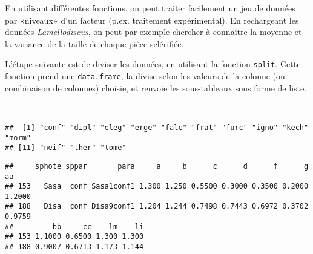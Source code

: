 En utilisant différentes fonctions, on peut traiter facilement un jeu de données par «niveaux» d'un facteur (p.ex. traitement expérimental).
En rechargeant les données \emph{Lamellodiscus}, on peut par exemple chercher à connaître la moyenne et la variance de la taille de chaque pièce sclérifiée.

\begin{knitrout}
\color{fgcolor}\begin{kframe}
\begin{flushleft}
\ttfamily\noindent
{}\hlassignement{\usebox{\hlnormalsizeboxlessthan}-}{\ }\hlkeyword{(}\hlkeyword{,}{\ }\hlargument{=}{\ }\hlkeyword{,}{\ }\hlargument{=}{\ }\hlkeyword{)}\mbox{}
\normalfont
\end{flushleft}
\end{kframe}
\end{knitrout}


\noindent L'étape suivante est de diviser les données, en utilisant la fonction \texttt{split}.
Cette fonction prend une \texttt{data.frame}, la divise selon les valeurs de la colonne (ou combinaison de colonnes) choisie, et renvoie les sous-tableaux sous forme de liste.

\begin{knitrout}
\color{fgcolor}\begin{kframe}
\begin{flushleft}
\ttfamily\noindent
{}\hlassignement{\usebox{\hlnormalsizeboxlessthan}-}{\ }\hlkeyword{(}\hlkeyword{,}{\ }\hlkeyword{\usebox{\hlnormalsizeboxdollar}}\hlkeyword{)}\hspace*{\fill}\\
\hlstd{}\hlkeyword{(}\hlkeyword{)}\mbox{}
\normalfont
\end{flushleft}
\begin{verbatim}
##  [1] "conf" "dipl" "eleg" "erge" "falc" "frat" "furc" "igno" "kech" "morm"
## [11] "neif" "ther" "tome"
\end{verbatim}
\begin{flushleft}
\ttfamily\noindent
{}\hlkeyword{\usebox{\hlnormalsizeboxdollar}}\mbox{}
\normalfont
\end{flushleft}
\begin{verbatim}
##     sphote sppar       para     a     b      c      d      f      g     aa
## 153   Sasa  conf Sasa1conf1 1.300 1.250 0.5500 0.3000 0.3500 0.2000 1.2000
## 188   Disa  conf Disa9conf1 1.204 1.244 0.7498 0.7443 0.6972 0.3702 0.9759
##         bb     cc    lm    li
## 153 1.1000 0.6500 1.300 1.300
## 188 0.9007 0.6713 1.173 1.144
\end{verbatim}
\end{kframe}
\end{knitrout}


